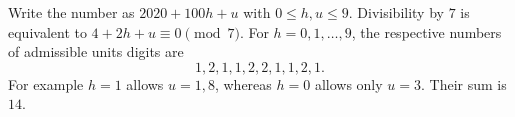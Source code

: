 Write the number as $2020+100h+u$ with $0\le h,u\le9$. Divisibility by $7$ is equivalent to $4+2h+u\equiv0\pmod7$. For $h=0,1,\ldots,9$, the respective numbers of admissible units digits are
\[
1,2,1,1,2,2,1,1,2,1.
\]
For example $h=1$ allows $u=1,8$, whereas $h=0$ allows only $u=3$. Their sum is $\boxed{14}$.
